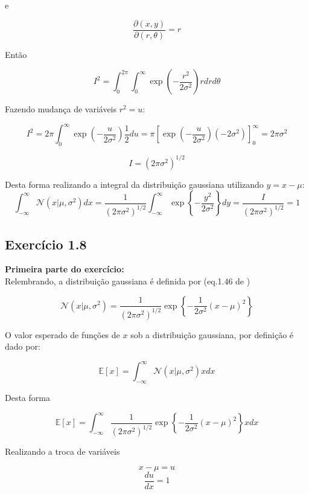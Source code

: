 \documentclass{article}
\begin{document}
  e
  
  \[
   \frac{\partial (x,y)}{\partial (r, \theta)} = r  
  \]
  
  Então 
  
  \[
     I^{2}= \int_{0}^{2 \pi} \int_{0}^{\infty} \exp \left(-\frac{r^{2}}{2\sigma^{2}}  \right) rdr d\theta
  \]
  
  
  Fazendo mudança de variáveis $r^{2}=u$:
  
  
  \[
    I^{2}= 2\pi \int_{0}^{\infty} \exp \left(-\frac{u}{2\sigma^{2}} \right) \frac{1}{2} du = \pi \left[   \exp \left(-\frac{u}{2\sigma^{2}} \right) (-2 \sigma^{2}) \right]^{\infty}_{0} = 2\pi \sigma^{2}
  \] 
  
  \[
   I = (2\pi \sigma^{2})^{1/2}
  \]
  
  Desta forma realizando a integral da distribuição gaussiana utilizando $y = x-\mu$:
  \[
   \int_{-\infty}^{\infty}\mathcal{N}(x|\mu,\sigma^{2}) dx =\frac{1}{(2\pi\sigma^{2})^{1/2}} \int_{-\infty}^{\infty} \exp\left\{ -\frac{y^{2}}{2\sigma^{2}}\right\} dy = \frac{I}{(2\pi \sigma^{2})^{1/2}} =1
  \]
\subsection{ Exerc\'icio 1.8}
 
   \textbf{Primeira parte do exercício:} \\ 
   Relembrando, a distribuição gaussiana é definida por (eq.1.46 de \cite{Bishop2006})
  
  \begin{equation}
  	\mathcal{N}(x|\mu,\sigma^{2})=\frac{1}{(2\pi\sigma^{2})^{1/2}}\exp\left\{ -\frac{1}{2\sigma^{2}}(x-\mu)^{2}\right\}                              
  \end{equation}
  
  O valor esperado de funções de $x$ sob a distribuição gaussiana, por definição é dado por:
  
   \begin{equation}
     	\mathbb{E}[x]=\int_{-\infty}^{\infty}\mathcal{N}(x|\mu,\sigma^{2})xdx
   \end{equation}
  
  Desta forma
  
      \[
     	\mathbb{E}[x]= \int_{-\infty}^{\infty} \frac{1}{(2\pi\sigma^{2})^{1/2}}\exp\left\{ -\frac{1}{2\sigma^{2}}(x-\mu)^{2}\right\} x dx
      \]
   
   Realizando a troca de variáveis
   
       \[ x-\mu = u  \] 
        \[\frac{du}{dx} = 1\] 
   
\end{document}
